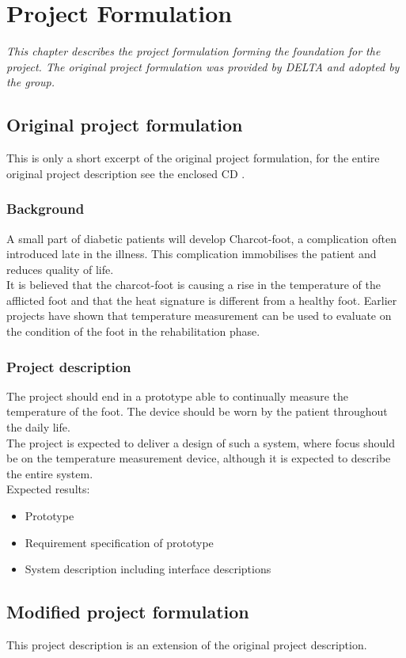 \chapter{Project Formulation}
\textit{This chapter describes the project formulation forming the foundation for the project. The original project formulation was provided by DELTA and adopted by the group.}
\section{Original project formulation}
This is only a short excerpt of the original project formulation, for the entire original project description see the enclosed CD \cite{cd}.
\subsection{Background}
A small part of diabetic patients will develop Charcot-foot, a complication often introduced late in the illness. This complication immobilises the patient and reduces quality of life.\\
It is believed that the charcot-foot is causing a rise in the temperature of the afflicted foot and that the heat signature is different from a healthy foot. Earlier projects have shown that temperature measurement can be used to evaluate on the condition of the foot in the rehabilitation phase.

\subsection{Project description}
The project should end in a prototype able to continually measure the temperature of the foot. The device should be worn by the patient throughout the daily life.\\
The project is expected to deliver a design of such a system, where focus should be on the temperature measurement device, although it is expected to describe the entire system.\\
Expected results:
\begin{itemize}
	\item Prototype
	\item Requirement specification of prototype
	\item System description including interface descriptions
\end{itemize}


\section{Modified project formulation}
This project description is an extension of the original project description. 
